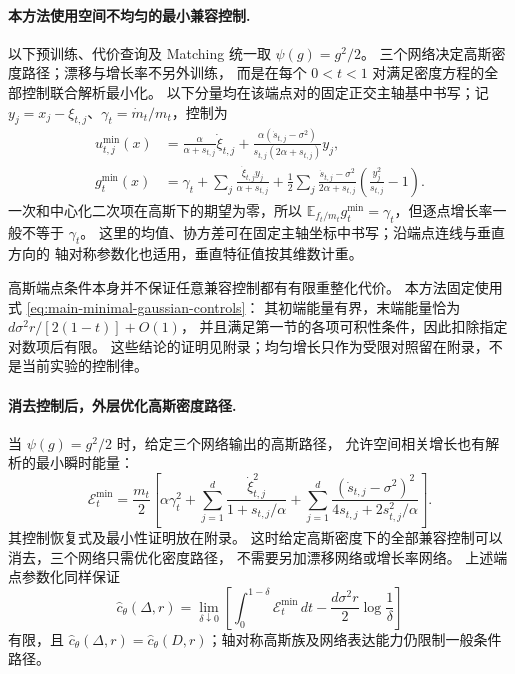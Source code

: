\documentclass[UTF8,a4paper,11pt,fontset=fandol]{ctexart}
\begin{document}
\paragraph{本方法使用空间不均匀的最小兼容控制.}
以下预训练、代价查询及 Matching 统一取 $\psi(g)=g^2/2$。
三个网络决定高斯密度路径；漂移与增长率不另外训练，
而是在每个 $0<t<1$ 对满足密度方程的全部控制联合解析最小化。
以下分量均在该端点对的固定正交主轴基中书写；记 $y_j=x_j-\xi_{t,j}$、$\gamma_t=\dot m_t/m_t$，控制为
\begin{equation}
\boxed{\begin{aligned}
u^{\min}_{t,j}(x)
&=\frac{\alpha}{\alpha+s_{t,j}}\dot\xi_{t,j}
+\frac{\alpha(\dot s_{t,j}-\sigma^2)}{s_{t,j}(2\alpha+s_{t,j})}y_j,\\
g_t^{\min}(x)
&=\gamma_t+\sum_j\frac{\dot\xi_{t,j}y_j}{\alpha+s_{t,j}}
+\frac12\sum_j\frac{\dot s_{t,j}-\sigma^2}{2\alpha+s_{t,j}}
\left(\frac{y_j^2}{s_{t,j}}-1\right).
\end{aligned}}
\label{eq:main-minimal-gaussian-controls}
\end{equation}
一次和中心化二次项在高斯下的期望为零，所以
$\mathbb E_{f_t/m_t}g_t^{\min}=\gamma_t$，但逐点增长率一般不等于 $\gamma_t$。
这里的均值、协方差可在固定主轴坐标中书写；沿端点连线与垂直方向的
轴对称参数化也适用，垂直特征值按其维数计重。

高斯端点条件本身并不保证任意兼容控制都有有限重整化代价。
本方法固定使用式 \eqref{eq:main-minimal-gaussian-controls}：
其初端能量有界，末端能量恰为 $d\sigma^2r/[2(1-t)]+O(1)$，
并且满足第一节的各项可积性条件，因此扣除指定对数项后有限。
这些结论的证明见附录；均匀增长只作为受限对照留在附录，不是当前实验的控制律。

\paragraph{消去控制后，外层优化高斯密度路径.}
当 $\psi(g)=g^2/2$ 时，给定三个网络输出的高斯路径，
允许空间相关增长也有解析的最小瞬时能量：
\begin{equation}
\mathcal E_t^{\min}
=\frac{m_t}{2}\left[
\alpha\gamma_t^2
+\sum_{j=1}^d\frac{\dot\xi_{t,j}^2}{1+s_{t,j}/\alpha}
+\sum_{j=1}^d
\frac{(\dot s_{t,j}-\sigma^2)^2}{4s_{t,j}+2s_{t,j}^2/\alpha}
\right].
\label{eq:quadratic-gaussian-minimal-energy}
\end{equation}
其控制恢复式及最小性证明放在附录。
这时给定高斯密度下的全部兼容控制可以消去，三个网络只需优化密度路径，
不需要另加漂移网络或增长率网络。
上述端点参数化同样保证
\begin{equation}
\widehat c_\theta(\Delta,r)
=\lim_{\delta\downarrow0}
\left[\int_0^{1-\delta}\mathcal E_t^{\min}\,dt
-\frac{d\sigma^2r}{2}\log\frac1\delta\right]
\end{equation}
有限，且 $\widehat c_\theta(\Delta,r)=\widehat c_\theta(D,r)$；轴对称高斯族及网络表达能力仍限制一般条件路径。
\end{document}
